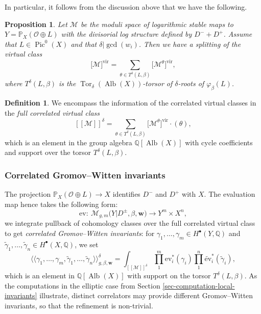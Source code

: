 \documentclass[pdftex]{sigma}
\newcommand{\vir}[1]{\big[#1\big]^\mathrm{vir}}
\newcommand{\fvir}[2]{[\![ #1 ]\!]^{#2}}
\newcommand{\ev}{\mathrm{ev}}
\newcommand{\Pic}{\operatorname{Pic}}
\newcommand{\Alb}{\operatorname{Alb}}
\newcommand{\PP}{\mathbb{P}}
\newcommand{\QQ}{\mathbb{Q}}
\newcommand{\bfw}{ {\boldsymbol w} }
\newcommand{\M}{\mathcal{M}}
\renewcommand{\O}{\mathcal{O}}
\numberwithin{equation}{section}
\newtheorem{prop}[theo]{Proposition}
\theoremstyle{definition}
\newtheorem{defi}[theo]{Definition}
\begin{document}
In particular, it follows from the discussion above that we have the following.
\begin{prop}
 Let $\M$ be the moduli space of logarithmic stable maps to $Y=\PP_X(\mathcal O\oplus L)$ with the divisorial log structure defined by $D^- + D^+$. Assume that $L\in\Pic^0(X)$ and that $\delta|\gcd(w_i)$.
 Then we have a splitting of the virtual class
 \[ \vir{\M}=\sum_{\theta\in T^\delta(L,\beta)}\vir{\M^\theta},\]
 where $T^\delta(L,\beta)$ is the $\operatorname{Tor}_{\delta}(\Alb(X))$-torsor of $\delta$-roots of $\varphi_\beta(L)$.
\end{prop}

\begin{defi}\label{def:fullrefined}
We encompass the information of the correlated virtual classes in the \textit{full correlated virtual class}
\[ \fvir{\M}{\delta} = \sum_{\theta\in T^\delta(L,\beta)} \vir{\M^\theta}\cdot (\theta),\]
which is an element in the group algebra $\QQ[\Alb(X)]$ with cycle coefficients and support over the torsor $T^\delta(L,\beta)$.
\end{defi}

\subsubsection{Correlated Gromov--Witten invariants}
The projection $\PP_X(\O\oplus L)\to X$ identifies $D^-$ and $D^+$ with $X$. The evaluation map hence takes the following form:
\[
\ev\colon\ \M_{g,m}\bigl(Y|D^\pm,\beta,\bfw\bigr) \longrightarrow Y^m\times X^n,
 \]
we integrate pullback of cohomology classes over the full correlated virtual class to get \textit{correlated Gromov--Witten invariants}: for $\gamma_1,\dots,\gamma_m\in H^\bullet(Y,\QQ)$ and $\widetilde{\gamma}_1,\dots,\widetilde{\gamma}_n\in H^\bullet(X,\QQ)$, we set
\[ \bigl\langle\bigl\langle\gamma_1,\dots,\gamma_m,\widetilde{\gamma}_1,\dots,\widetilde{\gamma}_n\bigr\rangle\bigr\rangle^\delta_{g,\beta,\bfw} = \int_{\fvir{\M}{\delta}} \prod_1^m\ev_i^*(\gamma_i)\prod_1^n\widetilde{\ev}_i^*(\widetilde{\gamma}_i), \]
which is an element in $\QQ[\Alb(X)]$ with support on the torsor $T^\delta(L,\beta)$. As the computations in the elliptic case from Section \ref{sec-computation-local-invariants} illustrate, distinct correlators may provide different Gromov--Witten invariants, so that the refinement is non-trivial.
\end{document}
